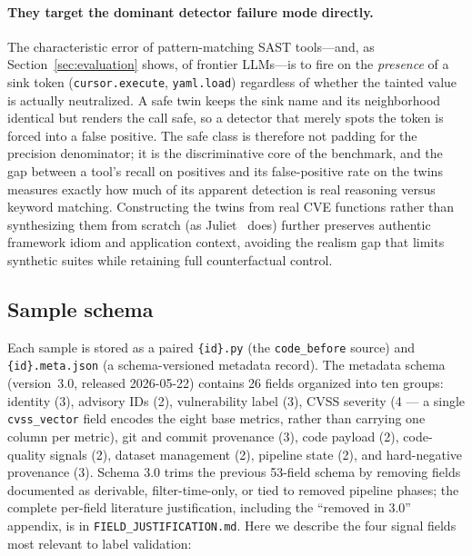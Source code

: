 \paragraph{They target the dominant detector failure mode directly.}
The characteristic error of pattern-matching SAST tools---and, as
Section~\ref{sec:evaluation} shows, of frontier LLMs---is to fire on
the \emph{presence} of a sink token (\texttt{cursor.execute},
\texttt{yaml.load}) regardless of whether the tainted value is
actually neutralized. A safe twin keeps the sink name and its
neighborhood identical but renders the call safe, so a detector that
merely spots the token is forced into a false positive. The safe
class is therefore not padding for the precision denominator; it is
the discriminative core of the benchmark, and the gap between a
tool's recall on positives and its false-positive rate on the twins
measures exactly how much of its apparent detection is real reasoning
versus keyword matching. Constructing the twins from real CVE
functions rather than synthesizing them from scratch (as
Juliet~\cite{juliet} does) further preserves authentic framework
idiom and application context, avoiding the realism gap that limits
synthetic suites while retaining full counterfactual control.

\subsection{Sample schema}
\label{sec:dataset:schema}

Each sample is stored as a paired \texttt{\{id\}.py} (the
\texttt{code\_before} source) and \texttt{\{id\}.meta.json} (a
schema-versioned metadata record). The metadata schema (version~3.0,
released 2026-05-22) contains 26 fields organized into ten groups:
identity (3), advisory IDs (2), vulnerability label (3), CVSS
severity (4 — a single \texttt{cvss\_vector} field encodes the eight
base metrics, rather than carrying one column per metric), git and
commit provenance (3), code payload (2), code-quality signals (2),
dataset management (2), pipeline state (2), and hard-negative
provenance (3). Schema 3.0 trims the previous 53-field schema by
removing fields documented as derivable, filter-time-only, or tied
to removed pipeline phases; the complete per-field literature
justification, including the ``removed in 3.0'' appendix, is in
\texttt{FIELD\_JUSTIFICATION.md}. Here we describe the four signal
fields most relevant to label validation:


